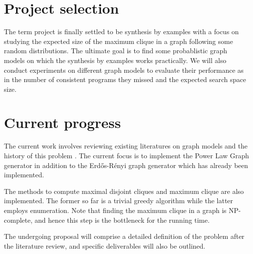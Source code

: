\documentclass{article}
\begin{document}
\newpage
\maketitle

\section{Project selection}
The term project is finally settled to be synthesis by examples with a focus on studying the expected size of the maximum clique in a graph following some random distributions. The ultimate goal is to find some probablistic graph models on which the synthesis by examples works practically. We will also conduct experiments on different graph models to evaluate their performance as in the number of consistent programs they missed and the expected search space size. 

\section{Current progress}
The current work involves reviewing existing literatures on graph models \cite{aiello2000random,easley2010networks} and the history of this problem \cite{gulwani2012spreadsheet,rolim2017learning,d2017nofaq}. The current focus is to implement the Power Law Graph generator in addition to the Erd\H{o}s-R\'enyi graph generator which has already been implemented.

The methods to compute maximal disjoint cliques and maximum clique are also implemented. The former so far is a trivial greedy algorithm while the latter employs enumeration. Note that finding the maximum clique in a graph is NP-complete, and hence this step is the bottleneck for the running time.

The undergoing proposal will comprise a detailed definition of the problem after the literature review, and specific deliverables will also be outlined. 
 
{}

\end{document}
